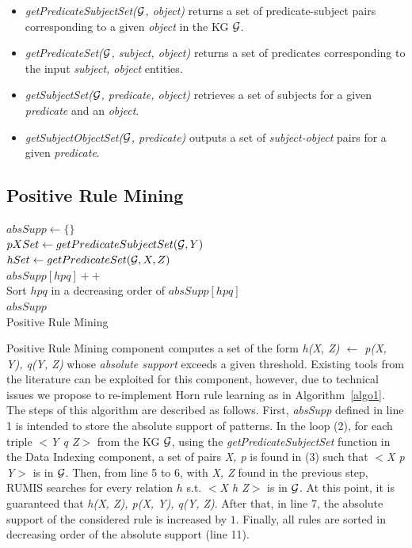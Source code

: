 \begin{itemize}
\item \textit{getPredicateSubjectSet($\mathcal{G}$, object)} returns a set of predicate-subject pairs corresponding to a given \textit{object} in the KG $\mathcal{G}$.
\item \textit{getPredicateSet($\mathcal{G}$, subject, object)} returns a set of predicates corresponding to the input \textit{subject, object} entities.
\item \textit{getSubjectSet($\mathcal{G}$, predicate, object)} retrieves a set of subjects for a given \textit{predicate} and an \textit{ object}.
\item \textit{getSubjectObjectSet($\mathcal{G}$, predicate)} outputs a set of \textit{subject-object} pairs for a given \textit{predicate}.
\end{itemize}

\subsection{Positive Rule Mining}

\IncMargin{1.5em}
\begin{algorithm}[h]
\DontPrintSemicolon
\SetAlgoLined
{}
\BlankLine
$absSupp \leftarrow \{\}$\\
\BlankLine
{} {
    \BlankLine
	$pXSet \leftarrow getPredicateSubjectSet(\mathcal{G}, Y)$\\
	 {
		$hSet \leftarrow getPredicateSet(\mathcal{G}, X, Z)$\\
		 {
			$absSupp[hpq]++$\\
		}
	}
}
\BlankLine
Sort $hpq$ in a decreasing order of $absSupp[hpq]$\\
\Return $absSupp$\\
\caption{Positive Rule Mining}
\label{algo1}
\end{algorithm}
\DecMargin{1.5em}

Positive Rule Mining component computes a set of the form \textit{h(X, Z) $\leftarrow$ p(X, Y), q(Y, Z)} whose \textit{absolute support} exceeds a given threshold. Existing tools from the literature can be exploited for this component, however, due to technical issues we propose to re-implement Horn rule learning as in Algorithm~\ref{algo1}. The steps of this algorithm are described as follows. First, \textit{absSupp} defined in line 1 is intended to store the absolute support of patterns. In the loop (2), for each triple \textit{$<$Y q Z$>$} from the KG $\mathcal{G}$, using the \textit{getPredicateSubjectSet} function in the Data Indexing component, a set of pairs \textit{X, p} is found in (3) such that \textit{$<$X p Y$>$} is in $\mathcal{G}$. Then, from line 5 to 6, with \textit{X, Z} found in the previous step, RUMIS searches for every relation $h$ s.t. \textit{$<$X h Z$>$} is in $\mathcal{G}$. At this point, it is guaranteed that \textit{h(X, Z), p(X, Y), q(Y, Z)}. After that, in line 7, the absolute support of the considered rule is increased by $1$. Finally, all rules are sorted in decreasing order of the absolute support (line 11).

